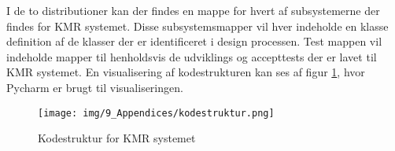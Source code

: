 \begin{appendices}
I de to distributioner kan der findes en mappe for hvert af subsystemerne der findes for KMR systemet. Disse subsystemsmapper vil hver indeholde en klasse definition af de klasser der er identificeret i design processen. Test mappen vil indeholde mapper til henholdsvis de udviklings og accepttests der er lavet til KMR systemet. En visualisering af kodestrukturen kan ses af figur \ref{fig:code_structure}, hvor Pycharm er brugt til visualiseringen.

\begin{figure}[H]
	\centering
	\texttt{[image: img/9\_Appendices/kodestruktur.png]}
	\caption{Kodestruktur for KMR systemet}
	\label{fig:code_structure}
\end{figure}

\end{appendices}




